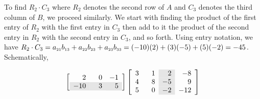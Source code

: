 To find $R_2 \cdot C_3$ where $R_2$ denotes the second row of $A$ and $C_3$ denotes the third column of $B$, we proceed similarly. We start with finding the product of the first entry of $R_2$ with the first entry in $C_3$ then add to it the product of the second entry in $R_2$ with the second entry in $C_3$, and so forth.  Using entry notation, we have $R_2 \cdot C_3 = a_{\mbox{\tiny$21$}}b_{\mbox{\tiny$13$}} + a_{\mbox{\tiny$22$}}b_{\mbox{\tiny$23$}} + a_{\mbox{\tiny$23$}}b_{\mbox{\tiny$33$}} = (-10)(2) + (3)(-5) + (5)(-2) = -45$.  Schematically, 

\[ \left[\begin{array}{rrr} 2 & 0 & -1 \\ \rowcolor[gray]{0.9} -10 & \hphantom{-}3 & 5 \\ \end{array} \right] \left[\begin{array}{rr>{\columncolor[gray]{0.9}}rr}  3 & \hphantom{-}1 & 2 & -8 \\ 4 & 8 & -5 & 9  \\ 5 & 0 & -2 & -12 \\  \end{array} \right] \]


